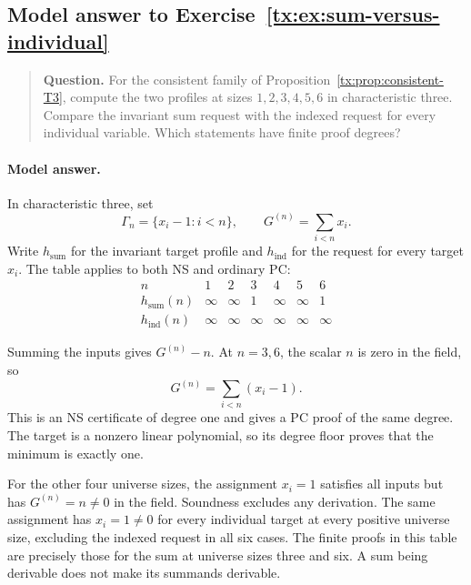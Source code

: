 \documentclass[11pt,a4paper,oneside,openany]{book}
\theoremstyle{definition}\newtheorem{definition}[theorem]{Definition}
\theoremstyle{remark}\newtheorem{remark}[theorem]{Remark}
\numberwithin{equation}{chapter}
\begin{document}
\begin{samepage}

\subsection*{Model answer to Exercise~\ref{tx:ex:sum-versus-individual}}\label{tx:ans:sum-versus-individual}

\begin{quote}\small\textbf{Question.} For the consistent family of Proposition~\ref{tx:prop:consistent-T3},
compute the two profiles at sizes $1,2,3,4,5,6$ in characteristic three.
Compare the invariant sum request with the indexed request for every
individual variable. Which statements have finite proof degrees?
\end{quote}

\paragraph{Model answer.}
In characteristic three, set
\[
 \Gamma_n=\{x_i-1:i<n\},\qquad G^{(n)}=\sum_{i<n}x_i.
\]
Write \(h_{\mathrm{sum}}\) for the invariant target profile and
\(h_{\mathrm{ind}}\) for the request for every target \(x_i\).
The table applies to both NS and ordinary PC:
\[
 \begin{array}{c|cccccc}
 n&1&2&3&4&5&6\\ \hline
 h_{\mathrm{sum}}(n)&\infty&\infty&1&\infty&\infty&1\\
 h_{\mathrm{ind}}(n)&\infty&\infty&\infty&\infty&\infty&\infty
 \end{array}
\]
\end{samepage}

Summing the inputs gives \(G^{(n)}-n\). At \(n=3,6\), the scalar \(n\)
is zero in the field, so
\[
                            G^{(n)}=\sum_{i<n}(x_i-1).
\]
This is an NS certificate of degree one and gives a PC proof of
the same degree. The target is a nonzero linear polynomial, so its
degree floor proves that the minimum is exactly one.

For the other four universe sizes, the assignment \(x_i=1\) satisfies all
inputs but has \(G^{(n)}=n\ne0\) in the field. Soundness excludes any
derivation. The same assignment has \(x_i=1\ne0\) for every
individual target at every positive universe size, excluding the indexed
request in all six cases.
The finite proofs in this table are precisely those for the sum at
universe sizes three and six. A sum being derivable does not make its summands derivable.
\end{document}
